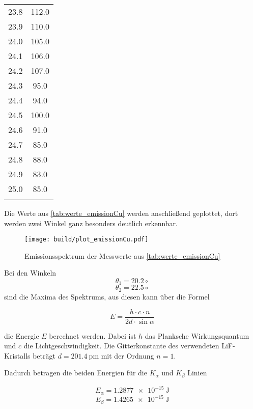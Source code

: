 \begin{table}
\begin{tabular}{S[table-format=1.1] S[table-format=4.1]}
    23.8&	112.0\\
    23.9&	110.0\\
    24.0&	105.0\\
    24.1&	106.0\\
    24.2&	107.0\\
    24.3&	95.0\\
    24.4&	94.0\\
    24.5&	100.0\\
    24.6&	91.0\\
    24.7&	85.0\\
    24.8&	88.0\\
    24.9&	83.0\\
    25.0&	85.0\\
    &\\
        \bottomrule
    \end{tabular}
\end{table}

Die Werte aus \autoref{tab:werte_emissionCu} werden anschließend geplottet, dort werden zwei Winkel ganz besonders deutlich erkennbar.

\begin{figure}
    \centering
    \texttt{[image: build/plot\_emissionCu.pdf]}
    \caption{Emissionsspektrum der Messwerte aus \autoref{tab:werte_emissionCu}}
    \label{fig:emissionCu_plot}
\end{figure}

Bei den Winkeln 
\begin{equation}
    \theta _1 = 20.2 \circ
\end{equation}
\begin{equation}
    \theta _2 = 22.5 \circ
\end{equation}
sind die Maxima des Spektrums, aus diesen kann über die Formel 

\begin{equation}
    E = \frac{h \cdot c \cdot n}{2d \cdot \sin{\alpha}}
\end{equation}

die Energie $E$ berechnet werden.
Dabei ist $h$ das Planksche Wirkungsquantum und $c$ die Lichtgeschwindigkeit.
Die Gitterkonstante des verwendeten LiF-Kristalls beträgt $d = \SI{201.4}{\pico\meter}$ mit der Ordnung $n = 1$.

Dadurch betragen die beiden Energien für die $K_\alpha$ und $K_\beta$ Linien

\begin{equation}
    E_\alpha = \SI{1.2877e-15}{\joule}
\end{equation}
\begin{equation}
    E_\beta = \SI{1.4265e-15}{\joule}
\end{equation}

